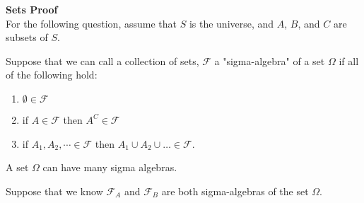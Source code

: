 \documentclass[addpoints]{examsetup}
\begin{document}
\examCoverPage

\begin{questions}


\question \textbf{Sets Proof} \\ For the following question, assume that $S$ is the universe, and $A$, $B$, and $C$ are subsets of $S$.


\newpage

\question
   Suppose that we can call a collection of sets, $\mathcal{F}$ a "sigma-algebra" of a set $\Omega$ if all of the following hold:
   \begin{enumerate}
      \item $\emptyset \in \mathcal{F}$
      \item if $A \in \mathcal{F}$ then $A^{C} \in \mathcal{F}$
      \item if $A_1, A_2, \cdots \in \mathcal{F}$ then $A_1 \cup A_2 \cup \ldots \in \mathcal{F}$.
   \end{enumerate}
   A set $\Omega$ can have many sigma algebras. 
   
   Suppose that we know $\mathcal{F}_A$ and $\mathcal{F}_B$ are both sigma-algebras of the set $\Omega$. 
\end{questions}
\end{document}
